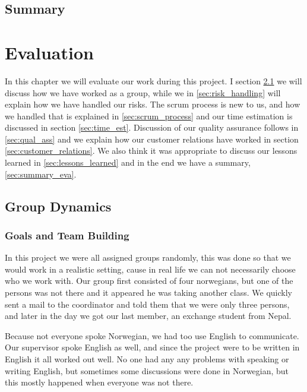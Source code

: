 \documentclass{report}
\begin{document}
\section{Summary} \label{sec:summary_conc}

\chapter{Evaluation} \label{cha:evaluation}
In this chapter we will evaluate our work during this project. I section \ref{sec:group_dynamics} we will discuss how we have worked as a group, while we in \ref{sec:risk_handling} will explain how we have handled our risks. The scrum process is new to us, and how we handled that is explained in \ref{sec:scrum_process} and our time estimation is discussed in section \ref{sec:time_est}. Discussion of our quality assurance follows in \ref{sec:qual_ass} and we explain how our customer relations have worked in section \ref{sec:customer_relations}. We also think it was appropriate to discuss our lessons learned in \ref{sec:lessons_learned} and in the end we have a summary, \ref{sec:summary_eva}.
\newpage
\section{Group Dynamics} \label{sec:group_dynamics}
\subsection{Goals and Team Building} \label{subsec:goals_team_building}
In this project we were all assigned groups randomly, this was done so that we would work in a realistic setting, cause in real life we can not necessarily choose who we work with. Our group first consisted of four norwegians, but one of the persons was not there and it appeared he was taking another class. We quickly sent a mail to the coordinator and told them that we were only three persons, and later in the day we got our last member, an exchange student from Nepal.

Because not everyone spoke Norwegian, we had too use English to communicate. Our supervisor spoke English as well, and since the project were to be written in English it all worked out well. No one had any any problems with speaking or writing English, but sometimes some discussions were done in Norwegian, but this mostly happened when everyone was not there.
\end{document}
